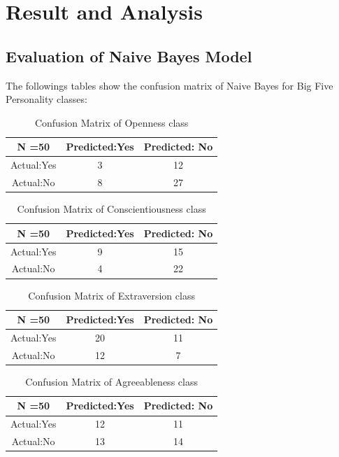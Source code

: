\documentclass[journal]{IEEEtran}
\begin{document}
\section{Result and Analysis}
\subsection{Evaluation of Naive Bayes Model}

The followings tables show the confusion matrix of Naive Bayes for Big Five Personality classes:

\FloatBarrier
\begin{table}[H]
\centering
\caption{Confusion Matrix of Openness class}
\begin{tabular}{ |c|c|c| }
 \hline
 N =50 & Predicted:Yes & Predicted: No \\
 \hline
 Actual:Yes&3 & 12 \\
 \hline
 Actual:No&8 & 27 \\
 \hline
\end{tabular}


\end{table}
\FloatBarrier
\begin{table}[H]
\centering
\caption{Confusion Matrix of Conscientiousness class}

\begin{tabular}{ |c|c|c| }
 \hline
 N =50 & Predicted:Yes & Predicted: No \\
 \hline
 Actual:Yes&9 & 15 \\
 \hline
 Actual:No&4 & 22 \\
 \hline
\end{tabular}
\end{table}
\FloatBarrier
\begin{table}[H]
\centering
 \caption{Confusion Matrix of Extraversion class}

\begin{tabular}{ |c|c|c| }
 \hline
 N =50 & Predicted:Yes & Predicted: No \\
 \hline
 Actual:Yes&20 & 11 \\
 \hline
 Actual:No&12 & 7 \\
 \hline
\end{tabular}
\end{table}
\FloatBarrier
\begin{table}[H]
\centering
 \caption{Confusion Matrix of Agreeableness class}

\begin{tabular}{ |c|c|c| }
 \hline
 N =50 & Predicted:Yes & Predicted: No \\
 \hline
 Actual:Yes&12 & 11 \\
 \hline
 Actual:No&13 & 14 \\
 \hline
\end{tabular}
\end{table}
\end{document}
